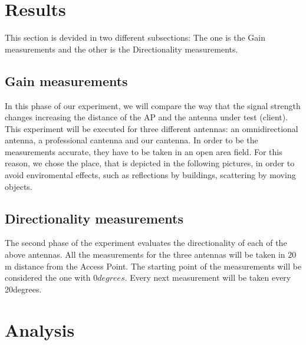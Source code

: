 \documentclass[12pt,a4paper]{article}
\begin{document}
\section{Results}
This section is devided in two different subsections: The one is the Gain measurements and the other is the Directionality measurements. 

\subsection{Gain measurements}
In this phase of our experiment, we will compare the way that the signal strength changes increasing the distance of the AP and the antenna under test (client). This experiment will be executed for three different antennas: an omnidirectional antenna, a professional cantenna and our cantenna. In order to be the measurements accurate, they have to be taken in an open area field. For this reason, we chose the place, that is depicted in the following pictures, in order to avoid enviromental effects, such as reflections by buildings, scattering by moving objects.

\subsection{Directionality measurements}
The second phase of the experiment evaluates the directionality of each of the above antennas. All the measurements for the three antennas will be taken in $20$m distance from the Access Point. The starting point of the measurements will be considered the one with $0degrees$. Every next measurement will be taken every 20degrees.

\section{Analysis}


\end{document}
